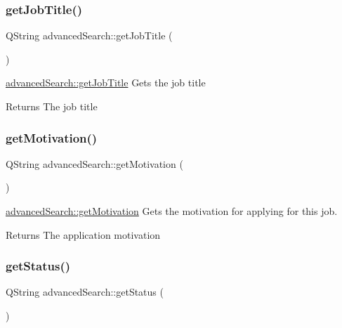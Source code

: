\subsubsection{\texorpdfstring{get\+Job\+Title()}{getJobTitle()}}
{\footnotesize\ttfamily Q\+String advanced\+Search\+::get\+Job\+Title (\begin{DoxyParamCaption}{ }\end{DoxyParamCaption})}



\mbox{\hyperlink{classadvanced_search_a7bcbaf1e2663396daacf9b033c34238a}{advanced\+Search\+::get\+Job\+Title}} Gets the job title 

\begin{DoxyReturn}{Returns}
The job title 
\end{DoxyReturn}
\mbox{\label{classadvanced_search_a40af6df4af92bc7f4cff89729df2c6da}} 
\subsubsection{\texorpdfstring{get\+Motivation()}{getMotivation()}}
{\footnotesize\ttfamily Q\+String advanced\+Search\+::get\+Motivation (\begin{DoxyParamCaption}{ }\end{DoxyParamCaption})}



\mbox{\hyperlink{classadvanced_search_a40af6df4af92bc7f4cff89729df2c6da}{advanced\+Search\+::get\+Motivation}} Gets the motivation for applying for this job. 

\begin{DoxyReturn}{Returns}
The application motivation 
\end{DoxyReturn}
\mbox{\label{classadvanced_search_afc318495c6475695844bd0f22c6c1e3c}} 
\subsubsection{\texorpdfstring{get\+Status()}{getStatus()}}
{\footnotesize\ttfamily Q\+String advanced\+Search\+::get\+Status (\begin{DoxyParamCaption}{ }\end{DoxyParamCaption})}



